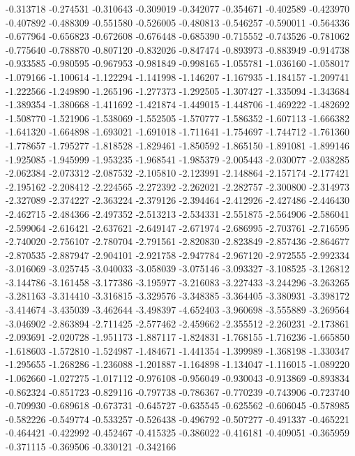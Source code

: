 -0.313718
-0.274531
-0.310643
-0.309019
-0.342077
-0.354671
-0.402589
-0.423970
-0.407892
-0.488309
-0.551580
-0.526005
-0.480813
-0.546257
-0.590011
-0.564336
-0.677964
-0.656823
-0.672608
-0.676448
-0.685390
-0.715552
-0.743526
-0.781062
-0.775640
-0.788870
-0.807120
-0.832026
-0.847474
-0.893973
-0.883949
-0.914738
-0.933585
-0.980595
-0.967953
-0.981849
-0.998165
-1.055781
-1.036160
-1.058017
-1.079166
-1.100614
-1.122294
-1.141998
-1.146207
-1.167935
-1.184157
-1.209741
-1.222566
-1.249890
-1.265196
-1.277373
-1.292505
-1.307427
-1.335094
-1.343684
-1.389354
-1.380668
-1.411692
-1.421874
-1.449015
-1.448706
-1.469222
-1.482692
-1.508770
-1.521906
-1.538069
-1.552505
-1.570777
-1.586352
-1.607113
-1.666382
-1.641320
-1.664898
-1.693021
-1.691018
-1.711641
-1.754697
-1.744712
-1.761360
-1.778657
-1.795277
-1.818528
-1.829461
-1.850592
-1.865150
-1.891081
-1.899146
-1.925085
-1.945999
-1.953235
-1.968541
-1.985379
-2.005443
-2.030077
-2.038285
-2.062384
-2.073312
-2.087532
-2.105810
-2.123991
-2.148864
-2.157174
-2.177421
-2.195162
-2.208412
-2.224565
-2.272392
-2.262021
-2.282757
-2.300800
-2.314973
-2.327089
-2.374227
-2.363224
-2.379126
-2.394464
-2.412926
-2.427486
-2.446430
-2.462715
-2.484366
-2.497352
-2.513213
-2.534331
-2.551875
-2.564906
-2.586041
-2.599064
-2.616421
-2.637621
-2.649147
-2.671974
-2.686995
-2.703761
-2.716595
-2.740020
-2.756107
-2.780704
-2.791561
-2.820830
-2.823849
-2.857436
-2.864677
-2.870535
-2.887947
-2.904101
-2.921758
-2.947784
-2.967120
-2.972555
-2.992334
-3.016069
-3.025745
-3.040033
-3.058039
-3.075146
-3.093327
-3.108525
-3.126812
-3.144786
-3.161458
-3.177386
-3.195977
-3.216083
-3.227433
-3.244296
-3.263265
-3.281163
-3.314410
-3.316815
-3.329576
-3.348385
-3.364405
-3.380931
-3.398172
-3.414674
-3.435039
-3.462644
-3.498397
-4.652403
-3.960698
-3.555889
-3.269564
-3.046902
-2.863894
-2.711425
-2.577462
-2.459662
-2.355512
-2.260231
-2.173861
-2.093691
-2.020728
-1.951173
-1.887117
-1.824831
-1.768155
-1.716236
-1.665850
-1.618603
-1.572810
-1.524987
-1.484671
-1.441354
-1.399989
-1.368198
-1.330347
-1.295655
-1.268286
-1.236088
-1.201887
-1.164898
-1.134047
-1.116015
-1.089220
-1.062660
-1.027275
-1.017112
-0.976108
-0.956049
-0.930043
-0.913869
-0.893834
-0.862324
-0.851723
-0.829116
-0.797738
-0.786367
-0.770239
-0.743906
-0.723740
-0.709930
-0.689618
-0.673731
-0.645727
-0.635545
-0.625562
-0.606045
-0.578985
-0.582226
-0.549774
-0.533257
-0.526438
-0.496792
-0.507277
-0.491337
-0.465221
-0.464421
-0.422992
-0.452467
-0.415325
-0.386022
-0.416181
-0.409051
-0.365959
-0.371115
-0.369506
-0.330121
-0.342166
